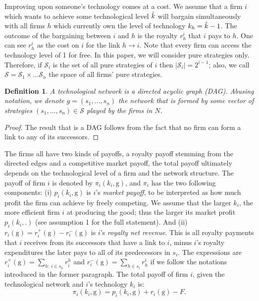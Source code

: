 \documentclass{article}
\newtheorem{definition}{Definition}
\begin{document}
\indent Improving upon someone's technology comes at a cost. We assume that a firm $i$ which wants to achieve some technological level $\Tilde{k}$ will bargain simultaneously with all firms $h$ which currently own the level of technology $k_h=\Tilde{k}-1$. The outcome of the bargaining between $i$ and $h$ is the royalty $r^{i}_h$ that $i$ pays to $h$. One can see $r^{i}_h$ as the cost on $i$ for the link $h\rightarrow i$. Note that every firm can access the technology level of 1 for free. In this paper, we will consider pure strategies only. Therefore, if $\mathcal{S}_i$ is the set of all pure strategies of $i$ then $|\mathcal{S}_i|=2^{i-1}$; also, we call $\mathcal{S}=\mathcal{S}_1\times\ldots \mathcal{S}_n$ the space of all firms' pure strategies.  \\


%

%

%


\begin{definition}
A technological network  is a directed acyclic graph (DAG). Abusing notation, we denote $g=(s_1,\dots, s_n)$ the network that is formed by some vector of strategies $(s_1,\ldots, s_n)\in \mathcal{S}$ played by the firms in $N$. 
\end{definition}
\begin{proof}
The result that  is a DAG follows from the fact that no firm can form a link to any of its successors. 
\end{proof}



\indent The firms all have two kinds of payoffs, a royalty payoff stemming from the directed edges and a competitive market payoff, the total payoff ultimately depends on the technological level of a firm and the network structure. The payoff of firm $i$ is denoted by $\pi_i(k_i,\text{g})$, and $\pi_i$ has the two following components: (i) $p_i(k_i,\text{g})$ is $i$'s \textit{market payoff}, to be interpreted as how much profit the firm can achieve by freely competing. We assume that the larger $k_i$, the more efficient firm $i$ at producing the good; thus the larger its market profit $p_i(k_i,.)$ (see assumption 1 for the full statement). And (ii) $r_i(\text{g})=r_i^+(\text{g})-r_i^-(\text{g})$ is $i$'s \textit{royalty net revenue}. This is all royalty payments that $i$ receives from its successors that have a link to $i$, minus $i$'s royalty expenditures the later pays to all of its predecessors in $s_i$. The expressions are $r^+_i(\text{g})=\sum_{h:~ i\in s_h}r^h_i$ and $r^-_i(\text{g})=\sum_{h\in s_i} r^{i}_h$ if we follow the notations introduced in the former paragraph. The total payoff of firm $i$, given the technological network  and $i$'s technology $k_i$ is: 
\begin{equation}
    \pi_i(k_i,\text{g})=p_i(k_i,\text{g})+r_i(\text{g}) -F. 
\end{equation}
\end{document}
